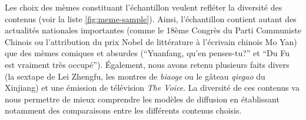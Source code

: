 \begin{figure}[htbp]
    \hspace{\fill}
    \hspace{\fill}%
    \hspace{\fill}%
    \caption{}
    \label{}
\end{figure}


Les choix des mèmes constituant l'échantillon veulent refléter la diversité des contenus (voir la liste \ref{fig:meme-sample}). Ainsi, l'échantillon contient autant des actualités nationales importantes (comme le 18ème Congrès du Parti Communiste Chinois ou l'attribution du prix Nobel de littérature à l'écrivain chinois Mo Yan) que des mèmes comiques et absurdes (``Yuanfang, qu'en penses-tu?'' et ``Du Fu est vraiment très occupé''). Également, nous avons retenu plusieurs faits divers (la sextape de Lei Zhengfu, les montres de \textit{biaoge} ou le gâteau \textit{qiegao} du Xinjiang) et une émission de télévision \textit{The Voice}. La diversité de ces contenus va nous permettre de mieux comprendre les modèles de diffusion en établissant notamment des comparaisons entre les différents contenus choisis.

